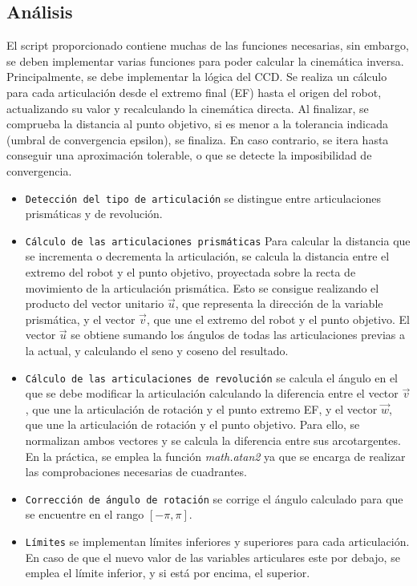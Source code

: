\subsection{Análisis}
El script proporcionado contiene muchas de las funciones necesarias, sin embargo, se deben implementar varias funciones para poder calcular la cinemática inversa. Principalmente, se debe implementar la lógica del CCD. Se realiza un cálculo para cada articulación desde el extremo final (EF) hasta el origen del robot, actualizando su valor y recalculando la cinemática directa. Al finalizar, se comprueba la distancia al punto objetivo, si es menor a la tolerancia indicada (umbral de convergencia epsilon), se finaliza. En caso contrario, se itera hasta conseguir una aproximación tolerable, o que se detecte la imposibilidad de convergencia.
\begin{itemize}
   \item \texttt{Detección del tipo de articulación} se distingue entre articulaciones prismáticas y de revolución.
   \item \texttt{Cálculo de las articulaciones prismáticas} Para calcular la distancia que se incrementa o decrementa la articulación, se calcula la distancia entre el extremo del robot y el punto objetivo, proyectada sobre la recta de movimiento de la articulación prismática. Esto se consigue realizando el producto del vector unitario $\vec{u}$, que representa la dirección de la variable prismática, y el vector $\vec{v}$, que une el extremo del robot y el punto objetivo. El vector $\vec{u}$ se obtiene sumando los ángulos de todas las articulaciones previas a la actual, y calculando el seno y coseno del resultado. 
   \item \texttt{Cálculo de las articulaciones de revolución} se calcula el ángulo en el que se debe modificar la articulación calculando la diferencia entre el vector $\vec{v}$, que une la articulación de rotación y el punto extremo EF, y el vector $\vec{w}$, que une la articulación de rotación y el punto objetivo. Para ello, se normalizan ambos vectores y se calcula la diferencia entre sus arcotargentes. En la práctica, se emplea la función \textit{math.atan2} ya que se encarga de realizar las comprobaciones necesarias de cuadrantes.
   \item \texttt{Corrección de ángulo de rotación} se corrige el ángulo calculado para que se encuentre en el rango $[-\pi, \pi]$.
   \item \texttt{Límites} se implementan límites inferiores y superiores para cada articulación. En caso de que el nuevo valor de las variables articulares este por debajo, se emplea el límite inferior, y si está por encima, el superior.
\end {itemize}

